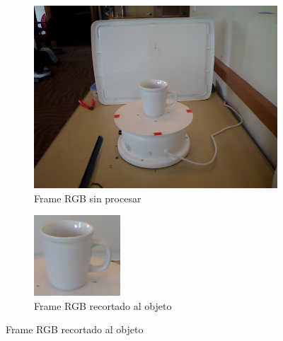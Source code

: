 \begin{figure}
    \centering
    \begin{subfigure}[b]{0.4\textwidth}
        \includegraphics[width=\textwidth]{img/base_rgbd/scene.png}
        \caption{Frame RGB sin procesar}
    \end{subfigure}
    \quad
    \begin{subfigure}[b]{0.4\textwidth}
        \includegraphics[width=\textwidth]{img/base_rgbd/crop.png}
        \caption{Frame RGB recortado al objeto}
    \end{subfigure}

\end{figure}
